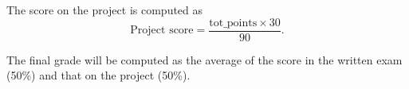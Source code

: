 \documentclass[10pt, conference, letterpaper]{IEEEtran}
\begin{document}
The score on the project is computed as
\begin{equation}
\textrm{Project score} = \frac{\textrm{tot\_points} \times 30}{90}.
\end{equation}

The final grade will be computed as the average of the score in the written exam (50\%) and that on the project (50\%).




\end{document}
